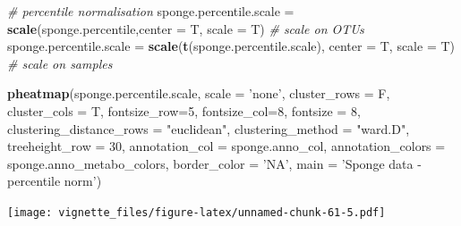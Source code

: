 \documentclass[]{book}
\newenvironment{Shaded}{\begin{snugshade}}{\end{snugshade}}
\newcommand{\KeywordTok}[1]{\textcolor[rgb]{0.13,0.29,0.53}{\textbf{#1}}}
\newcommand{\DataTypeTok}[1]{\textcolor[rgb]{0.13,0.29,0.53}{#1}}
\newcommand{\DecValTok}[1]{\textcolor[rgb]{0.00,0.00,0.81}{#1}}
\newcommand{\StringTok}[1]{\textcolor[rgb]{0.31,0.60,0.02}{#1}}
\newcommand{\CommentTok}[1]{\textcolor[rgb]{0.56,0.35,0.01}{\textit{#1}}}
\newcommand{\NormalTok}[1]{#1}
\begin{document}
\begin{Shaded}
\begin{Highlighting}[]
\CommentTok{# percentile normalisation}
\NormalTok{sponge.percentile.scale =}\StringTok{ }\KeywordTok{scale}\NormalTok{(sponge.percentile,}\DataTypeTok{center =}\NormalTok{ T, }\DataTypeTok{scale =}\NormalTok{ T) }\CommentTok{# scale on OTUs}
\NormalTok{sponge.percentile.scale =}\StringTok{ }\KeywordTok{scale}\NormalTok{(}\KeywordTok{t}\NormalTok{(sponge.percentile.scale), }\DataTypeTok{center =}\NormalTok{ T, }\DataTypeTok{scale =}\NormalTok{ T) }\CommentTok{# scale on samples}

\KeywordTok{pheatmap}\NormalTok{(sponge.percentile.scale, }
         \DataTypeTok{scale =} \StringTok{'none'}\NormalTok{, }
         \DataTypeTok{cluster_rows =}\NormalTok{ F, }
         \DataTypeTok{cluster_cols =}\NormalTok{ T, }
         \DataTypeTok{fontsize_row=}\DecValTok{5}\NormalTok{, }\DataTypeTok{fontsize_col=}\DecValTok{8}\NormalTok{,}
         \DataTypeTok{fontsize =} \DecValTok{8}\NormalTok{,}
         \DataTypeTok{clustering_distance_rows =} \StringTok{"euclidean"}\NormalTok{,}
         \DataTypeTok{clustering_method =} \StringTok{"ward.D"}\NormalTok{,}
         \DataTypeTok{treeheight_row =} \DecValTok{30}\NormalTok{,}
         \DataTypeTok{annotation_col =}\NormalTok{ sponge.anno_col,}
         \DataTypeTok{annotation_colors =}\NormalTok{ sponge.anno_metabo_colors,}
         \DataTypeTok{border_color =} \StringTok{'NA'}\NormalTok{,}
         \DataTypeTok{main =} \StringTok{'Sponge data - percentile norm'}\NormalTok{)}
\end{Highlighting}
\end{Shaded}

\texttt{[image: vignette\_files/figure-latex/unnamed-chunk-61-5.pdf]}
\end{document}
